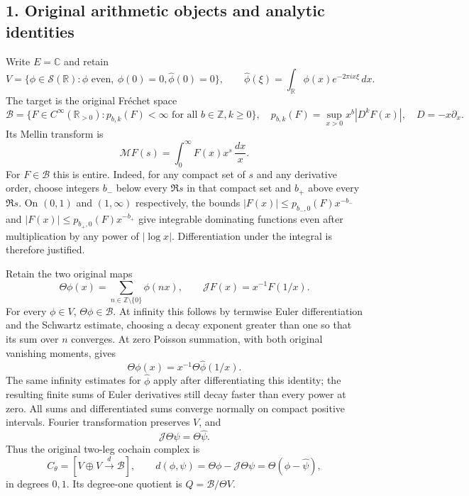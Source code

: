 \documentclass[10pt,a4paper,oneside]{report}
\begin{document}
\subsection{1. Original arithmetic objects and analytic
identities}\label{proof05:original-arithmetic-objects-and-analytic-identities}

Write \(E=\mathbb C\) and retain \[
 V=\{\phi\in\mathcal S(\mathbb R):\phi\text{ even},\ \phi(0)=0,
              \widehat\phi(0)=0\},\qquad
 \widehat\phi(\xi)=\int_{\mathbb R}\phi(x)e^{-2\pi i x\xi}\,dx.
\] The target is the original Fréchet space \[
 \mathscr B=\{F\in C^\infty(\mathbb R_{>0}):p_{b,k}(F)<\infty
                       \text{ for all }b\in\mathbb Z,k\ge0\},
 \quad p_{b,k}(F)=\sup_{x>0}x^b|D^kF(x)|,
 \quad D=-x\partial_x.
\] Its Mellin transform is \[
 \mathcal MF(s)=\int_0^\infty F(x)x^s\,\frac{dx}{x}.
\] For \(F\in\mathscr B\) this is entire. Indeed, for any compact set of
\(s\) and any derivative order, choose integers \(b_-\) below every
\(\Re s\) in that compact set and \(b_+\) above every \(\Re s\). On
\((0,1)\) and \((1,\infty)\) respectively, the bounds
\(|F(x)|\le p_{b_-,0}(F)x^{-b_-}\) and
\(|F(x)|\le p_{b_+,0}(F)x^{-b_+}\) give integrable dominating functions
even after multiplication by any power of \(|\log x|\). Differentiation
under the integral is therefore justified.

Retain the two original maps \[
 \Theta\phi(x)=\sum_{n\in\mathbb Z\setminus\{0\}}\phi(nx),
 \qquad \mathcal JF(x)=x^{-1}F(1/x).
\] For every \(\phi\in V\), \(\Theta\phi\in\mathscr B\). At infinity
this follows by termwise Euler differentiation and the Schwartz
estimate, choosing a decay exponent greater than one so that its sum
over \(n\) converges. At zero Poisson summation, with both original
vanishing moments, gives \[
 \Theta\phi(x)=x^{-1}\Theta\widehat\phi(1/x).
\] The same infinity estimates for \(\widehat\phi\) apply after
differentiating this identity; the resulting finite sums of Euler
derivatives still decay faster than every power at zero. All sums and
differentiated sums converge normally on compact positive intervals.
Fourier transformation preserves \(V\), and \[
 \mathcal J\Theta\psi=\Theta\widehat\psi.
\] Thus the original two-leg cochain complex is \[
 C_\theta=[V\oplus V\xrightarrow{d}\mathscr B],\qquad
 d(\phi,\psi)=\Theta\phi-\mathcal J\Theta\psi
             =\Theta(\phi-\widehat\psi),
\] in degrees \(0,1\). Its degree-one quotient is
\(Q=\mathscr B/\Theta V\).
\end{document}

